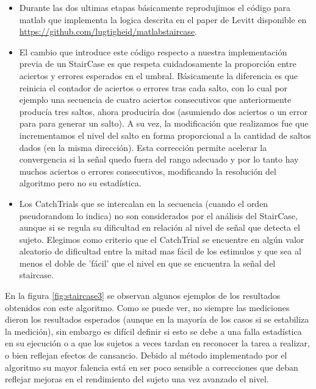 \documentclass{article}
\begin{document}
\begin{itemize}
        \item Durante las dos ultimas etapas básicamente reprodujimos el código para matlab que implementa la logica descrita en el paper de Levitt\cite{staircase} disponible en \url{https://github.com/lugtigheid/matlabstaircase}. 
        \item El cambio que introduce este código respecto a nuestra implementación previa de un StairCase es que respeta cuidadosamente la proporción entre aciertos y errores esperados en el umbral. Básicamente la diferencia es que reinicia el contador de aciertos o errores tras cada salto, con lo cual por ejemplo una secuencia de cuatro aciertos consecutivos que anteriormente producía tres saltos, ahora produciría dos (asumiendo dos aciertos o un error para para generar un salto). A su vez, la modificación que realizamos fue que incrementamos el nivel del salto en forma proporcional a la cantidad de saltos dados (en la misma dirección). Esta corrección permite acelerar la convergencia si la señal quedo fuera del rango adecuado y por lo tanto hay muchos aciertos o errores consecutivos, modificando la resolución del algoritmo pero no su estadística.
        \item Los CatchTrials que se intercalan en la secuencia (cuando el orden pseudorandom lo indica) no son considerados por el análisis del StairCase, aunque si se regula su dificultad en relación al nivel de señal que detecta el sujeto. Elegimos como criterio que el CatchTrial se encuentre en algún valor aleatorio de dificultad entre la mitad mas fácil de los estimulos y que sea al menos el doble de 'fácil' que el nivel en que se encuentra la señal del staircase.
        
    \end{itemize}
    
    En la figura \ref{fig:staircase3} se observan algunos ejemplos de los resultados obtenidos con este algoritmo. Como se puede ver, no siempre las mediciones dieron los resultados esperados (aunque en la mayoría de los casos si se estabiliza la medición), sin embargo es difícil definir si esto se debe a una falla estadística en su ejecución o a que los sujetos a veces tardan en reconocer la tarea a realizar, o bien reflejan efectos de cansancio. Debido al método implementado por el algoritmo su mayor falencia está en ser poco sensible a correcciones que deban reflejar mejoras en el rendimiento del sujeto una vez avanzado el nivel. 
    
\end{document}
